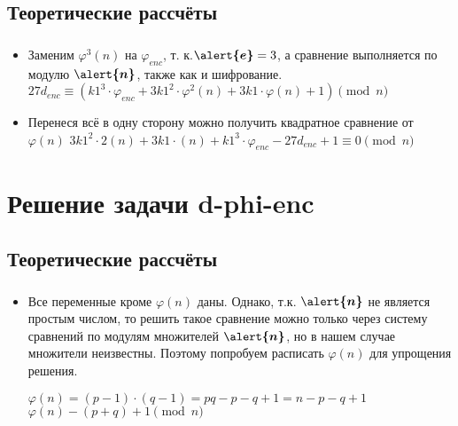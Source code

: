 \documentclass[t]{beamer}
\begin{document}
\subsection{Теоретические рассчёты}
\begin{frame}
	\frametitle{\insertsection}
	\framesubtitle{\insertsubsection}
	\begin{itemize}
            \item Заменим $\varphi^3(n)$ на $\varphi_{enc}$, т. к.$\boldsymbol{\alert{e}} = 3$, а сравнение выполняется по модулю $\boldsymbol{\alert{n}}$, также как и шифрование.\newline\newline
            \( 27d_{enc} \equiv (k1^3 \cdot \varphi_{enc} + 3k1^2 \cdot \varphi^2(n) + 3k1 \cdot \varphi(n) + 1) \pmod{n} \)\newline
            \item Перенеся всё в одну сторону можно получить квадратное сравнение от $\varphi(n)$\newline\newline
            \( 3k1^2 \cdot 2(n) + 3k1 \cdot (n) + k1^3 \cdot \varphi_{enc} - 27d_{enc} + 1 \equiv 0 \pmod{n} \)\newline
	\end{itemize}
\end{frame}

\section{Решение задачи d-phi-enc}
\subsection{Теоретические рассчёты}
\begin{frame}[t] %
	\frametitle{\insertsection}
	\framesubtitle{\insertsubsection}
	\begin{itemize}
            \item Все переменные кроме $\varphi(n)$ даны. Однако, т.к. $\boldsymbol{\alert{n}}$ не является простым числом, то решить такое сравнение можно только через систему сравнений по модулям множителей $\boldsymbol{\alert{n}}$, но в нашем случае множители неизвестны. Поэтому попробуем расписать $\varphi(n)$ для упрощения решения.\newline\newline
            \begin{center}
            \( \varphi(n)=(p-1)\cdot(q-1)=pq-p-q+1=n-p-q+1 \)\newline
            \( \varphi(n)-(p+q)+1 \pmod{n} \)
            \end{center}
	\end{itemize}
\end{frame}
\end{document}
